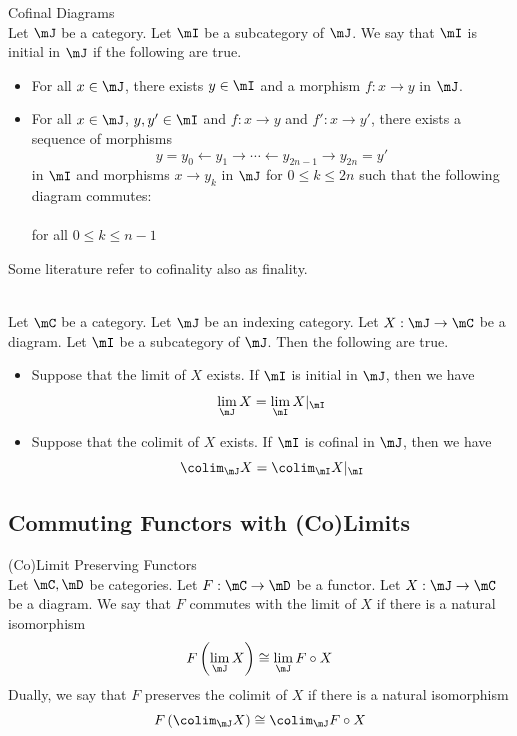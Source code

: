 \documentclass[a4paper]{article}
\begin{document}
\begin{defn}{Cofinal Diagrams}{}\\
Let $\mJ$ be a category. Let $\mI$ be a subcategory of $\mJ$. We say that $\mI$ is initial in $\mJ$ if the following are true. 
\begin{itemize}
\item For all $x\in\mJ$, there exists $y\in\mI$ and a morphism $f:x\to y$ in $\mJ$. 
\item For all $x\in\mJ$, $y,y'\in\mI$ and $f:x\to y$ and $f':x\to y'$, there exists a sequence of morphisms $$y=y_0\leftarrow y_1\rightarrow\cdots\leftarrow y_{2n-1}\rightarrow y_{2n}=y'$$ in $\mI$ and morphisms $x\to y_k$ in $\mJ$ for $0\leq k\leq 2n$ such that the following diagram commutes: \\
 \\
for all $0\leq k\leq n-1$
\end{itemize}
\end{defn}

Some literature refer to cofinality also as finality. 

\begin{prp}{}{}\\
Let $\mC$ be a category. Let $\mJ$ be an indexing category. Let $X:\mJ\to\mC$ be a diagram. Let $\mI$ be a subcategory of $\mJ$. Then the following are true. 
\begin{itemize}
\item Suppose that the limit of $X$ exists. If $\mI$ is initial in $\mJ$, then we have $$\lim_\mJ X=\lim_\mI X|_\mI$$
\item Suppose that the colimit of $X$ exists. If $\mI$ is cofinal in $\mJ$, then we have $$\colim_\mJ X=\colim_\mI X|_\mI$$
\end{itemize}
\end{prp}

\subsection{Commuting Functors with (Co)Limits}
\begin{defn}{(Co)Limit Preserving Functors}{}\\
Let $\mC,\mD$ be categories. Let $F:\mC\to\mD$ be a functor. Let $X:\mJ\to\mC$ be a diagram. We say that $F$ commutes with the limit of $X$ if there is a natural isomorphism $$F\left(\lim_\mJ X\right)\cong\lim_\mJ F\circ X$$ Dually, we say that $F$ preserves the colimit of $X$ if there is a natural isomorphism $$F\left(\colim_\mJ X\right)\cong\colim_\mJ F\circ X$$
\end{defn}
\end{document}
